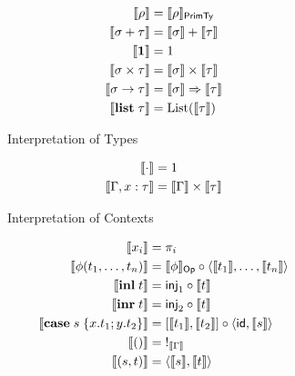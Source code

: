 \begin{figure}
  \begin{subfigure}[t]{0.47\linewidth}
    \small
    \begin{align*}
      \llbracket \rho \rrbracket &= \llbracket \rho \rrbracket_{\mathsf{PrimTy}}
      \\
      \llbracket \sigma + \tau \rrbracket &= \textstyle {\llbracket \sigma \rrbracket} + {\llbracket \tau \rrbracket}
      \\
      \llbracket \mathbf{1} \rrbracket &= 1
      \\
      \llbracket \sigma \times \tau \rrbracket &= \llbracket \sigma \rrbracket \times \llbracket \tau \rrbracket
      \\
      \llbracket \sigma \to \tau \rrbracket &= \llbracket \sigma \rrbracket \Rightarrow \llbracket \tau \rrbracket
      \\
      \llbracket \mathbf{list}\;\tau \rrbracket &= \mathrm{List}(\llbracket \tau \rrbracket)
    \end{align*}
    \caption{Interpretation of Types}
    \label{fig:semantics:types}
  \end{subfigure}
  \begin{subfigure}[t]{0.47\linewidth}
    \small
    \begin{align*}
      \llbracket \cdot \rrbracket &= 1
      \\
      \llbracket \Gamma, x: \tau \rrbracket &= \llbracket \Gamma \rrbracket \times \llbracket \tau \rrbracket
    \end{align*}
    \caption{Interpretation of Contexts}
    \label{fig:semantics:contexts}
\end{subfigure}
\begin{subfigure}{0.8\linewidth}
  \begin{minipage}{0.5\linewidth}
  \small
  \begin{align*}
  \llbracket x_i \rrbracket &= \pi_i
  \\
  \llbracket \phi(t_1, \ldots, t_n) \rrbracket
  &=
  \llbracket \phi \rrbracket_{\mathsf{Op}} \circ \langle \llbracket t_1 \rrbracket, \ldots, \llbracket t_n \rrbracket\rangle
  \\
  \llbracket \mathbf{inl}\;t \rrbracket &= \mathsf{inj}_1 \circ \llbracket t \rrbracket
  \\
  \llbracket \mathbf{inr}\;t \rrbracket &= \mathsf{inj}_2 \circ \llbracket t \rrbracket
  \\
  \llbracket \mathbf{case}\;s\;\{x.t_1; y.t_2\} \rrbracket &= [\llbracket t_1 \rrbracket, \llbracket t_2 \rrbracket] \circ \langle \mathsf{id}, \llbracket s \rrbracket\rangle
  \\
  \llbracket () \rrbracket &=\;!_{\llbracket \Gamma \rrbracket}
  \\
    \llbracket (s,t) \rrbracket &= \langle \llbracket s \rrbracket, \llbracket t \rrbracket\rangle
  \end{align*}
\end{minipage}
\begin{minipage}{0.5\linewidth}

\end{minipage}
\end{subfigure}
\end{figure}

